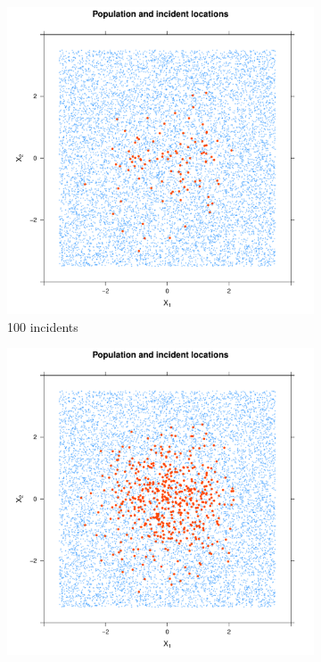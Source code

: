 \begin{figure}[htbp]
    \centering
    \begin{subfigure}{0.45\textwidth}
        \includegraphics[width=\textwidth]{results/unif_100_1.0_1h/output/population_and_incidents_scatter}
        \caption{100 incidents}
    \end{subfigure}
    \begin{subfigure}{0.45\textwidth}
        \includegraphics[width=\textwidth]{results/unif_500_1.0_1h/output/population_and_incidents_scatter}

\end{subfigure}
\end{figure}
